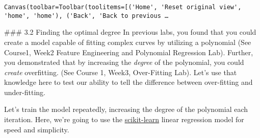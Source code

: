 \documentclass[11pt]{article}
\begin{document}
    
    \begin{verbatim}
Canvas(toolbar=Toolbar(toolitems=[('Home', 'Reset original view', 'home', 'home'), ('Back', 'Back to previous …
    \end{verbatim}

    
    \#\#\# 3.2 Finding the optimal degree In previous labs, you found that
you could create a model capable of fitting complex curves by utilizing
a polynomial (See Course1, Week2 Feature Engineering and Polynomial
Regression Lab). Further, you demonstrated that by increasing the
\emph{degree} of the polynomial, you could \emph{create} overfitting.
(See Course 1, Week3, Over-Fitting Lab). Let's use that knowledge here
to test our ability to tell the difference between over-fitting and
under-fitting.

Let's train the model repeatedly, increasing the degree of the
polynomial each iteration. Here, we're going to use the
\href{https://scikit-learn.org/stable/modules/generated/sklearn.linear_model.LinearRegression.html\#sklearn.linear_model.LinearRegression}{scikit-learn}
linear regression model for speed and simplicity.
\end{document}
